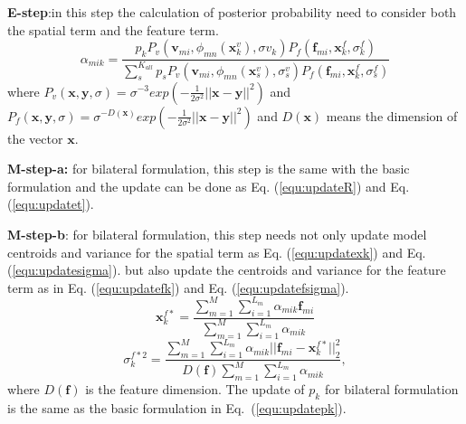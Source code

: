 \noindent\textbf{E-step}:in this step the calculation of posterior probability need to consider both the spatial term and the feature term.
\begin{equation}
\label{equ:bestep}
\alpha_{mik}=\frac{p_kP_v( \mathbf{v}_{mi},\phi_{mn}(\mathbf{x}^v_k),\sigma v_k)P_f(\mathbf f_{mi},\mathbf x^f_k,\sigma^f_k)}{\sum_s^{K_{all}}p_sP_v( \mathbf v_{mi},\phi_{mn}(\mathbf{x}^v_s),\sigma^v_s)P_f(\mathbf f_{mi},\mathbf{x}^f_k,\sigma^f_s)}
\end{equation}
where $P_v(\mathbf{x},\mathbf{y},\sigma)=\sigma^{-3}exp(-\frac{1}{2\sigma^2}||\mathbf{x}-\mathbf{y}||^2)$ and $P_f(\mathbf{x},\mathbf{y},\sigma)=\sigma^{-D(\mathbf{x})}exp(-\frac{1}{2\sigma^2}||\mathbf{x}-\mathbf{y}||^2)$ and $D(\mathbf{x})$ means the dimension of the vector $\mathbf x$. 

\textbf{M-step-a:} for bilateral formulation, this step is the same with the basic formulation and the update can be done as Eq. (\ref{equ:updateR}) and Eq. (\ref{equ:updatet}).

\textbf{M-step-b}: for bilateral formulation, this step needs not only update model centroids and variance for the spatial term as Eq. (\ref{equ:updatexk}) and Eq. (\ref{equ:updatesigma}).
but also update the centroids and variance for the feature term as in Eq. (\ref{equ:updatefk}) and Eq. (\ref{equ:updatefsigma}).
\begin{equation}
\label{equ:updatefk}
\mathbf{x}_k^{f*}=\frac{\sum_{m=1}^M\sum_{i=1}^{L_m}\alpha_{mik}\mathbf{f}_{mi}}{\sum_{m=1}^M\sum_{i=1}^{L_m}\alpha_{mik}}
\end{equation}
\begin{equation}
\label{equ:updatefsigma}
\sigma_k^{f*2}=\frac{\sum_{m=1}^M\sum_{i=1}^{L_m}\alpha_{mik}||\mathbf {f}_{mi}-\mathbf{x}_k^{f*}||_2^2}{D(\mathbf{f})\sum_{m=1}^M\sum_{i=1}^{L_m}\alpha_{mik}},
\end{equation}
where $D(\mathbf{f})$ is the feature dimension. The update of $p_k$ for bilateral formulation is the same as the basic formulation in Eq.~(\ref{equ:updatepk}).
